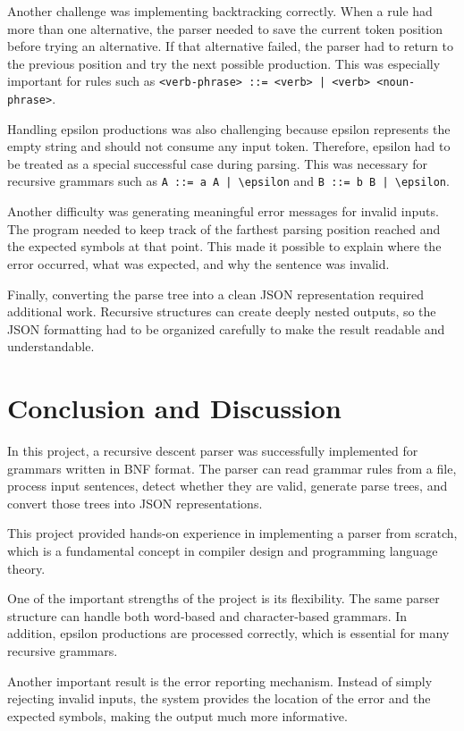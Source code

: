 \documentclass[12pt,a4paper]{article}
\begin{document}
	Another challenge was implementing backtracking correctly. When a rule had more than one alternative, the parser needed to save the current token position before trying an alternative. If that alternative failed, the parser had to return to the previous position and try the next possible production. This was especially important for rules such as \texttt{<verb-phrase> ::= <verb> | <verb> <noun-phrase>}.
	
	Handling epsilon productions was also challenging because epsilon represents the empty string and should not consume any input token. Therefore, epsilon had to be treated as a special successful case during parsing. This was necessary for recursive grammars such as \texttt{A ::= a A | \textbackslash epsilon} and \texttt{B ::= b B | \textbackslash epsilon}.
	
	Another difficulty was generating meaningful error messages for invalid inputs. The program needed to keep track of the farthest parsing position reached and the expected symbols at that point. This made it possible to explain where the error occurred, what was expected, and why the sentence was invalid.
	
	Finally, converting the parse tree into a clean JSON representation required additional work. Recursive structures can create deeply nested outputs, so the JSON formatting had to be organized carefully to make the result readable and understandable.
	
	\section{Conclusion and Discussion}
	In this project, a recursive descent parser was successfully implemented for grammars written in BNF format. The parser can read grammar rules from a file, process input sentences, detect whether they are valid, generate parse trees, and convert those trees into JSON representations.
	
	This project provided hands-on experience in implementing a parser from scratch, which is a fundamental concept in compiler design and programming language theory.
	
	One of the important strengths of the project is its flexibility. The same parser structure can handle both word-based and character-based grammars. In addition, epsilon productions are processed correctly, which is essential for many recursive grammars.
	
	Another important result is the error reporting mechanism. Instead of simply rejecting invalid inputs, the system provides the location of the error and the expected symbols, making the output much more informative.
	
\end{document}
